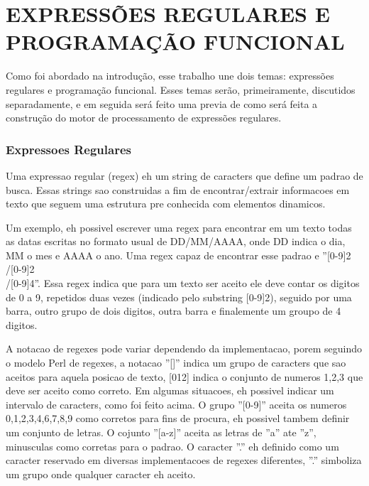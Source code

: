 \section{EXPRESSÕES REGULARES E PROGRAMAÇÃO FUNCIONAL}
Como foi abordado na introdução, esse trabalho une dois temas: expressões regulares e programação funcional.
Esses temas serão, primeiramente, discutidos separadamente, e em seguida será feito uma previa de como será feita a construção do motor de processamento de expressões regulares.

\subsubsection{Expressoes Regulares}


Uma expressao regular (regex) eh um string de caracters que define um padrao de busca.
Essas strings sao construidas a fim de encontrar/extrair informacoes em texto que seguem uma estrutura pre conhecida com elementos dinamicos.

Um exemplo, eh possivel escrever uma regex para encontrar em um texto todas as datas escritas no formato usual de DD/MM/AAAA, onde DD indica o dia, MM o mes e AAAA o ano.
Uma regex capaz de encontrar esse padrao e ''[0-9]{2}\\/[0-9]{2}\\/[0-9]{4}''.
Essa regex indica que para um texto ser aceito ele deve contar os digitos de 0 a 9, repetidos duas vezes (indicado pelo substring [0-9]{2}), seguido por uma barra, outro grupo de dois digitos, outra barra e finalemente um groupo de 4 digitos.

A notacao de regexes pode variar dependendo da implementacao, porem seguindo o modelo Perl de regexes, a notacao ''[]'' indica um grupo de caracters que sao aceitos para aquela posicao de texto, [012] indica o conjunto de numeros {1,2,3} que deve ser aceito como correto.
Em algumas situacoes, eh possivel indicar um intervalo de caracters, como foi feito acima.
O grupo ''[0-9]'' aceita os numeros {0,1,2,3,4,6,7,8,9} como corretos para fins de procura, eh possivel tambem definir um conjunto de letras.
O cojunto ''[a-z]'' aceita as letras de ''a'' ate ''z'', minusculas como corretas para o padrao.
O caracter ''.'' eh definido como um caracter reservado em diversas implementacoes de regexes diferentes, ''.'' simboliza um grupo onde qualquer caracter eh aceito.

